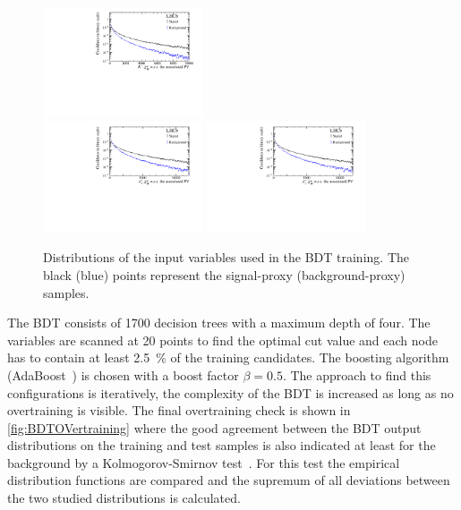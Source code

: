 \begin{figure}[tbp]
\begin{center}
		\includegraphics[width=0.42\textwidth]{07selection/figs/BDTInputs/ab3_IPCHI2_OWNPV.pdf}\\
		\includegraphics[width=0.42\textwidth]{07selection/figs/BDTInputs/ab4_IPCHI2_OWNPV.pdf}
		\includegraphics[width=0.42\textwidth]{07selection/figs/BDTInputs/ab5_IPCHI2_OWNPV.pdf}
	\end{center}
	\caption{Distributions of the input variables used in the BDT training.
	The black (blue) points represent the signal-proxy (background-proxy) samples.}
	\label{fig:BDTInput2}
\end{figure}
The \ac{BDT} consists of \num{1700} decision trees with a maximum depth of four.
The variables are scanned at \num{20} points to find the optimal cut value and each node has to contain at least \SI{2.5}{\percent} of the training candidates.
The boosting algorithm (AdaBoost~\cite{AdaBoost}) is chosen with a boost factor $\beta=0.5$.
The approach to find this configurations is iteratively, \ie the complexity of the \ac{BDT} is increased as long as no overtraining is visible.
The final overtraining check is shown in \cref{fig:BDTOVertraining} where the good agreement between the \ac{BDT} output distributions on the training and test samples is also indicated at least for the background by a Kolmogorov-Smirnov test~\cite{Bohm:389738}.
For this test the empirical distribution functions are compared and the supremum of all deviations between the two studied distributions is calculated.
